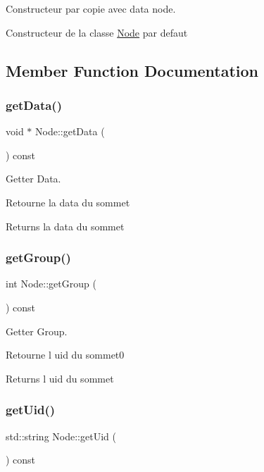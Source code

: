 Constructeur par copie avec data node. 

Constructeur de la classe \mbox{\hyperlink{class_node}{Node}} par defaut 

\subsection{Member Function Documentation}
\mbox{\label{class_node_abdb083d1af1b62ee3f90f9996518f5cb}} 
\subsubsection{\texorpdfstring{get\+Data()}{getData()}}
{\footnotesize\ttfamily void $\ast$ Node\+::get\+Data (\begin{DoxyParamCaption}{ }\end{DoxyParamCaption}) const}



Getter Data. 

Retourne la data du sommet

\begin{DoxyReturn}{Returns}
la data du sommet 
\end{DoxyReturn}
\mbox{\label{class_node_a459e4ba8eb31ccc165d00110a6e4d9ae}} 
\subsubsection{\texorpdfstring{get\+Group()}{getGroup()}}
{\footnotesize\ttfamily int Node\+::get\+Group (\begin{DoxyParamCaption}{ }\end{DoxyParamCaption}) const}



Getter Group. 

Retourne l uid du sommet0

\begin{DoxyReturn}{Returns}
l uid du sommet 
\end{DoxyReturn}
\mbox{\label{class_node_a53a0fb412c1047a27e07e7e4c5749bee}} 
\subsubsection{\texorpdfstring{get\+Uid()}{getUid()}}
{\footnotesize\ttfamily std\+::string Node\+::get\+Uid (\begin{DoxyParamCaption}{ }\end{DoxyParamCaption}) const}



